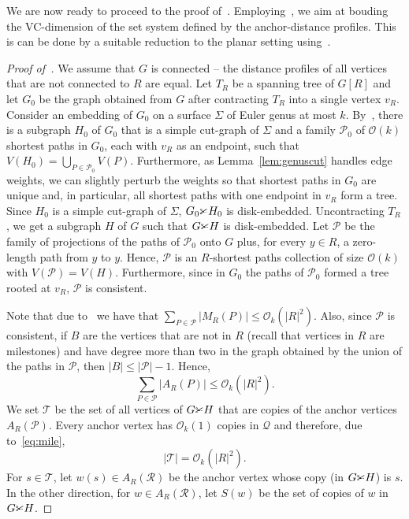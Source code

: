 We are now ready to proceed to the proof of~.
Employing~,
we aim at bouding the VC-dimension of the set system defined by the anchor-distance profiles.
This is can be done by a suitable reduction to the planar setting using~.



\begin{proof}[Proof of~]
  We assume that $G$ is connected -- the distance profiles of all vertices that are not connected to $R$ are equal.
  Let $T_R$ be a spanning tree of $G[R]$ and let $G_0$ be the graph obtained from $G$ after contracting $T_R$ into a single vertex $v_R$. 
  Consider an embedding of $G_0$ on a surface $\Sigma$ of Euler genus at most $k$.
  By~, there is a subgraph $H_0$ of $G_0$ that is a simple cut-graph of $\Sigma$ and a family $\mathcal{P}_0$ of $\mathcal{O}(k)$ shortest
  paths in $G_0$, each with $v_R$ as an endpoint, such that $V(H_0)=\bigcup_{P\in\mathcal{P}_0}V(P)$.
  Furthermore, as Lemma~\ref{lem:genuscut} handles edge weights, we can slightly perturb
  the weights so that shortest paths in $G_0$ are unique and, in particular, 
  all shortest paths with one endpoint in $v_R$ form a tree.
  Since $H_0$ is a simple cut-graph of $\Sigma$, $G_0\cutgraph H_0$ is disk-embedded.
  Uncontracting $T_R$, we get a subgraph $H$ of $G$ such that $G\cutgraph H$ is disk-embedded.
  Let $\mathcal{P}$ be the family of projections of the paths of $\mathcal{P}_0$
  onto $G$ plus, for every $y \in R$, a zero-length path from $y$ to $y$. 
  Hence, $\mathcal{P}$ is an $R$-shortest paths collection of size $\mathcal{O}(k)$
  with $V(\mathcal{P}) = V(H)$.
  Furthermore, since in $G_0$ the paths of $\mathcal{P}_0$ formed a tree rooted
  at $v_R$, $\mathcal{P}$ is consistent.

  Note that due to~ we have that $\sum_{P\in\mathcal{P}} |M_R(P)|\le \mathcal{O}_k(|R|^2)$.
  Also, since $\mathcal{P}$ is consistent, 
  if $B$ are the vertices that are not in $R$
  (recall that vertices in $R$ are milestones) and have degree more than two in the graph obtained by the union of the paths in $\mathcal{P}$, then $|B|\leq |\mathcal{P}|-1$.
  Hence,
  \begin{equation}
    \sum_{P\in\mathcal{P}} |A_R(P)|\le \mathcal{O}_k(|R|^2).\label{eq:mile}
  \end{equation}
  We set $\mathcal{T}$ be the set of all vertices of $G\cutgraph H$
  that are copies of the anchor vertices $A_R(\mathcal{P})$.
  Every anchor vertex has $\mathcal{O}_k(1)$ copies in $\mathcal{Q}$
  and therefore, due to~\eqref{eq:mile},
  \begin{equation}
    |\mathcal{T}|=\mathcal{O}_k(|R|^2).\label{eq:term_size}
  \end{equation}
  For $s \in \mathcal{T}$, let $w(s) \in A_R(\mathcal{R})$ be the anchor vertex
  whose copy (in $G \cutgraph H$) is $s$. In the other direction, for $w \in A_R(\mathcal{R})$, let $S(w)$
  be the set of copies of $w$ in $G \cutgraph H$. 
  

\end{proof}
